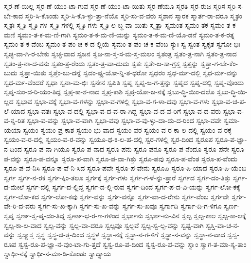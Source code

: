 {ಸ್ಮರ-ಣೆ-ಯಿಲ್ಲ
ಸ್ಮರ-ಣೆ-ಯುಂ-ಟಾ-ಗುವ
ಸ್ಮರ-ಣೆ-ಯುಂ-ಟಾ-ಯಿತು
ಸ್ಮರ-ಣೆಯೂ
ಸ್ಮರತಿ
ಸ್ಮರ-ರುಜ
ಸ್ಮರಿಸ
ಸ್ಮರಿ-ಸ-ಬೇ-ಕಾದ
ಸ್ಮರಿ-ಸಿ-ಕೊಂಡು
ಸ್ಮರಿ-ಸಿ-ಕೊ-ಳ್ಳು-ತ್ತಾ-ನೆಯೊ
ಸ್ಮರಿ-ಸು-ವ-ವರು
ಸ್ಮಶಾನ
ಸ್ಮಾರಕ
ಸ್ಮಾರ್ತ-ರಾ-ದರೂ
ಸ್ಮೃತಂ
ಸ್ಮೃತಃ
ಸ್ಮೃತಿ
ಸ್ಮೃತಿ-ಗಳ
ಸ್ಮೃತಿ-ಗಳಲ್ಲಿ
ಸ್ಮೃತಿ-ಗಳು
ಸ್ಮೃತಿ-ಲ-ಬ್ಧ-ವಾ-ಯಿತು
ಸ್ಮೃತ್ವಾ
ಸ್ಯಮಂತ
ಸ್ಯಮಂ-ತಕ
ಸ್ಯಮಂ-ತ-ಕ-ಮಣಿ
ಸ್ಯಮಂ-ತ-ಕ-ಮ-ಣಿ-ಗಾಗಿ
ಸ್ಯಮಂ-ತ-ಕ-ಮ-ಣಿ-ಯನ್ನು
ಸ್ಯಮಂ-ತ-ಕ-ಮ-ಣಿ-ಯೊ-ಡನೆ
ಸ್ಯಮಂ-ತ-ಕ-ರತ್ನ
ಸ್ಯಮಂ-ತ-ಕ-ವೆಂಬ
ಸ್ಯಮಂ-ತ-ಪಂ-ಚ-ಕ-ದ-ಲ್ಲಿಯೆ
ಸ್ಯಮಂ-ತ-ಪಂ-ಚ-ಕ-ವೆಂಬ
ಸ್ಯುಃ
ಸ್ವ
ಸ್ವಂತ
ಸ್ವಕೃತ
ಸ್ವಗೋ-ಭಿಃ
ಸ್ವಚ್ಛ-ವಾ-ಗಿ-ರ-ಬೇಕು
ಸ್ವಚ್ಛ-ವಾದ
ಸ್ವಜನ
ಸ್ವಜ-ನಾ-ಸ್ತ-ಸ-ಮ-ಸ್ತ-ಮಲಂ
ಸ್ವತಂತ್ರ
ಸ್ವತಂ-ತ್ರ-ನಾಗಿ
ಸ್ವತಂ-ತ್ರ-ನಾದ
ಸ್ವತಂ-ತ್ರ-ನಾ-ದ-ವನು
ಸ್ವತಂ-ತ್ರ-ರೆಂದು
ಸ್ವತಂ-ತ್ರ-ವಾ-ದುದು
ಸ್ವತಃ
ಸ್ವತೇ-ಜ-ಸಾ-ಗ್ರಸ್ತ
ಸ್ವತ್ತನ್ನು
ಸ್ವತ್ತಾ-ಗ-ಬೇ-ಕೆಂ-ಬುದು
ಸ್ವತ್ತಾ-ಯಿತು
ಸ್ವತ್ತೆಂ-ಬು-ದನ್ನೆ
ಸ್ವದಂ-ಷ್ಟ್ರ-ಯೋ-ನ್ನಿ-ತ-ಧರೋ
ಸ್ವಧರಂ
ಸ್ವಧ-ರ್ಮ-ದಲ್ಲಿ
ಸ್ವಧ-ರ್ಮ-ವನ್ನು
ಸ್ವಧ-ರ್ಮ-ವೆಂದರೆ
ಸ್ವಧಾ
ಸ್ವನಾ-ಮ-ಭಿಃ
ಸ್ವನೇನ
ಸ್ವಪಿತಿ
ಸ್ವಪ್ನ
ಸ್ವಪ್ನ-ಜ-ಗ-ತ್ತನ್ನು
ಸ್ವಪ್ನದ
ಸ್ವಪ್ನ-ದಲ್ಲಿ
ಸ್ವಪ್ನ-ವೊಂದು
ಸ್ವಪ್ನ-ಸುಂ-ದ-ರಿ-ಯಂ-ತಿದ್ದ
ಸ್ವಪ್ರ-ಕಾ-ಶ-ನಾದ
ಸ್ವಪ್ರ-ಕಾಶಿ
ಸ್ವಪ್ರ-ಯೋ-ಜ-ನಕ್ಕೆ
ಸ್ವಬು-ದ್ಧಿ-ಯಿಂ-ದಲೊ
ಸ್ವಬು-ದ್ಧಿ-ಯಿ-ಲ್ಲದ
ಸ್ವಭಾವ
ಸ್ವಭಾ-ವಕ್ಕೆ
ಸ್ವಭಾ-ವ-ಗಳನ್ನು
ಸ್ವಭಾ-ವ-ಗಳಲ್ಲಿ
ಸ್ವಭಾ-ವ-ಗ-ಳಾ-ದವು
ಸ್ವಭಾ-ವ-ಗಳು
ಸ್ವಭಾ-ವ-ಚ-ಪ-ಲೆ-ಯಾದ
ಸ್ವಭಾ-ವತಃ
ಸ್ವಭಾ-ವ-ದಲ್ಲಿ
ಸ್ವಭಾ-ವ-ದ-ವ-ರಾ-ಗಿದ್ದ
ಸ್ವಭಾ-ವ-ದ-ವ-ರಿಗೆ
ಸ್ವಭಾ-ವ-ದ-ವರು
ಸ್ವಭಾ-ವ-ವ-ನ್ನ-ರಿತ
ಸ್ವಭಾ-ವ-ವನ್ನು
ಸ್ವಭಾ-ವ-ವಾಗಿ
ಸ್ವಭಾ-ವವು
ಸ್ವಭಾ-ವ-ವು-ಳ್ಳು-ದಾ-ದು-ದ-ರಿಂದ
ಸ್ವಭಾ-ವವೇ
ಸ್ವಮಾ-ಯಯಾ
ಸ್ವಯಂ
ಸ್ವಯಂ-ಪ್ರ-ಕಾಶ
ಸ್ವಯಂ-ಭು-ವಾದ
ಸ್ವಯಂ-ವರ
ಸ್ವಯಂ-ವ-ರ-ಕಾ-ಲ-ದಲ್ಲಿ
ಸ್ವಯಂ-ವ-ರಕ್ಕೆ
ಸ್ವಯಂ-ವ-ರ-ದಲ್ಲಿ
ಸ್ವಯಂ-ವ-ರ-ವನ್ನು
ಸ್ವಯೂ-ಥ-ಕ-ಲ-ಹ-ದಲ್ಲಿ
ಸ್ವರ-ಗಳಲ್ಲಿ
ಸ್ವರ-ದಿಂದ
ಸ್ವರೂಪ
ಸ್ವರೂ-ಪ-ಜ್ಞಾ-ನ-ದಿಂದ
ಸ್ವರೂ-ಪ-ನಾ-ಗಿಯೂ
ಸ್ವರೂ-ಪ-ನಾದ
ಸ್ವರೂ-ಪನು
ಸ್ವರೂ-ಪನೂ
ಸ್ವರೂ-ಪ-ನೆಂದೂ
ಸ್ವರೂ-ಪನೇ
ಸ್ವರೂ-ಪ-ವನ್ನು
ಸ್ವರೂ-ಪ-ವನ್ನೂ
ಸ್ವರೂ-ಪ-ವಾಗಿ
ಸ್ವರೂ-ಪ-ವಾ-ಗಿತ್ತು
ಸ್ವರೂ-ಪವು
ಸ್ವರೂ-ಪ-ವೆಂತ
ಸ್ವರೂ-ಪ-ವೆಂದು
ಸ್ವರೂ-ಪ-ವೆ-ನಿಸಿ
ಸ್ವರೂ-ಪ-ವೆ-ನಿ-ಸಿದ
ಸ್ವರೂ-ಪವೇ
ಸ್ವರೂ-ಪ-ವೇನು
ಸ್ವರೂಪಿ
ಸ್ವರೂ-ಪಿ-ಯಾದ
ಸ್ವರೂ-ಪಿ-ಯೆಂಬ
ಸ್ವರ್ಗ
ಸ್ವರ್ಗ-ನ-ರಕ
ಸ್ವರ್ಗ-ಕ್ಕಿಂ-ತಲೂ
ಸ್ವರ್ಗಕ್ಕೆ
ಸ್ವರ್ಗ-ಗಳು
ಸ್ವರ್ಗ-ಗ-ಳೆ-ನ್ನು-ತ್ತಾರೆ
ಸ್ವರ್ಗದ
ಸ್ವರ್ಗ-ದಂ-ತಿತ್ತು
ಸ್ವರ್ಗ-ದ-ಮೇಲೆ
ಸ್ವರ್ಗ-ದಲ್ಲಿ
ಸ್ವರ್ಗ-ದ-ಲ್ಲಿದ್ದ
ಸ್ವರ್ಗ-ದ-ಲ್ಲಿ-ರುವ
ಸ್ವರ್ಗ-ದಿಂದ
ಸ್ವರ್ಗ-ಪ-ದ-ವಿ-ಯನ್ನು
ಸ್ವರ್ಗ-ಲೋ-ಕಕ್ಕೆ
ಸ್ವರ್ಗ-ಲೋ-ಕದ
ಸ್ವರ್ಗ-ಲೋ-ಕವು
ಸ್ವರ್ಗ-ವನ್ನು
ಸ್ವರ್ಗ-ವನ್ನೊ
ಸ್ವರ್ಗ-ವಾ-ದ-ರೇನು
ಸ್ವರ್ಗ-ವೆಂಬ
ಸ್ವರ್ಗವೇ
ಸ್ವರ್ಗ-ವೇ-ರಿ-ದ-ವರು
ಸ್ವರ್ಗ-ಸು-ಖ-ಕ್ಕಾಗಿ
ಸ್ವರ್ಗ-ಸು-ಖ-ವನ್ನು
ಸ್ವರ್ಗ-ಸು-ಖವೂ
ಸ್ವರ್ಗಾದಿ
ಸ್ವರ್ಗಾ-ದಿ-ಗ-ಳಿಗೂ
ಸ್ವರ್ಣ-ಸ್ವಪ್ನ
ಸ್ವರ್ಣ-ಸ್ವ-ಪ್ನ-ದಂ-ತಿದ್ದ
ಸ್ವರ್ಣಾ-ಭ-ರ-ಣ-ಗಳಿಂದ
ಸ್ವರ್ಭಾನು
ಸ್ವರ್ಭಾ-ನು-ವಿನ
ಸ್ವಲ್ಪ
ಸ್ವಲ್ಪ-ಕಾಲ
ಸ್ವಲ್ಪ-ಕಾ-ಲಕ್ಕೆ
ಸ್ವಲ್ಪ-ಕಾ-ಲ-ವಾದ
ಸ್ವಲ್ಪ-ವನ್ನು
ಸ್ವಲ್ಪ-ವಾ-ದರೂ
ಸ್ವಲ್ಪವೂ
ಸ್ವಲ್ಪವೆ
ಸ್ವಲ್ಪ-ಸ್ವ-ಲ್ಪ-ವನ್ನು
ಸ್ವಷ್ಟ-ವಾಗಿ
ಸ್ವಸ್ತಿ-ವಾ-ಚ-ನ-ವನ್ನು
ಸ್ವಸ್ತ್ಯಾಸ್ತ
ಸ್ವಸ್ಥ
ಸ್ವಸ್ಥ-ಚಿ-ತ್ತ-ದಿಂದ
ಸ್ವಸ್ಥಳ
ಸ್ವಸ್ಥಾ-ನಕ್ಕೆ
ಸ್ವಸ್ಥಾ-ನ-ಗ-ಳಿಗೆ
ಸ್ವಸ್ಥಾ-ನ-ವನ್ನು
ಸ್ವಸ್ಥಾ-ನ-ವಾದ
ಸ್ವಸ್ವ-ರೂಪ
ಸ್ವಸ್ವ-ರೂ-ಪ-ಜ್ಞಾ-ನ-ವುಂ-ಟಾ-ಗು-ತ್ತದೆ
ಸ್ವಸ್ವ-ರೂ-ಪ-ದಿಂದ
ಸ್ವಸ್ವ-ರೂ-ಪ-ವನ್ನು
ಸ್ವಾಂ
ಸ್ವಾಗ-ತ-ಮಾ-ಸ್ಯ-ತಾಂ
ಸ್ವಾಧೀ-ನಕ್ಕೆ
ಸ್ವಾಧೀ-ನ-ಮಾ-ಡಿ-ಕೊಂಡು
ಸ್ವಾಧ್ಯಾಯ
}
